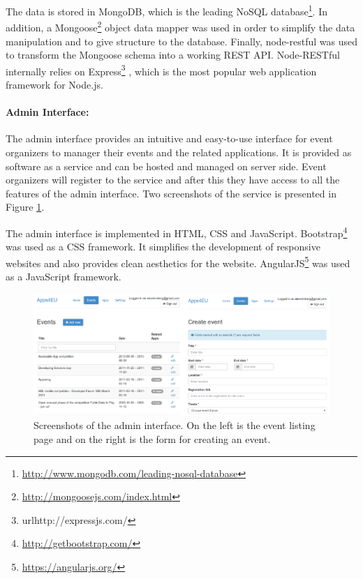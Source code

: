 The data is stored in MongoDB, which is the leading NoSQL database\footnote{\url{http://www.mongodb.com/leading-nosql-database}}. In addition, a Mongoose\footnote{\url{http://mongoosejs.com/index.html}} object data mapper  was used in order to simplify the data manipulation and to give structure to the database. Finally, node-restful  was used to transform the Mongoose schema into a working REST API. Node-RESTful internally relies on Express\footnote{url{http://expressjs.com/}} , which is the most popular web application framework for Node.js.

\paragraph{Admin Interface:}
The admin interface provides an intuitive and easy-to-use interface for event organizers to manager their events and the related applications. It is provided as software as a service and can be hosted and managed on server side. Event organizers will register to the service and after this they have access to all the features of the admin interface. Two screenshots of the service is presented in Figure \ref{fig:adminInterface}.

The admin interface is implemented in HTML, CSS and JavaScript. Bootstrap\footnote{\url{http://getbootstrap.com/}}  was used as a CSS framework. It simplifies the development of responsive websites and also provides clean aesthetics for the website. AngularJS\footnote{\url{https://angularjs.org/}}  was used as a JavaScript framework.

\begin{figure}[ht!]
\includegraphics[scale=0.95]{img/adminInterface.pdf}
\caption{Screenshots of the admin interface. On the left is the event listing
 page and on the right is the form for creating an event.}
 \label{fig:adminInterface}
\end{figure}


